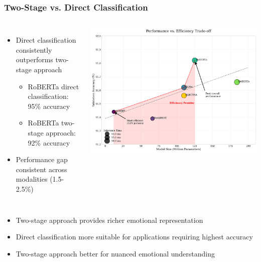 \begin{frame}
\frametitle{Two-Stage vs. Direct Classification}
\begin{columns}
\begin{itemize}
    \item Direct classification consistently outperforms two-stage approach
    \begin{itemize}
        \item RoBERTa direct classification: 95\% accuracy
        \item RoBERTa two-stage approach: 92\% accuracy
    \end{itemize}
    \item Performance gap consistent across modalities (1.5-2.5\%)
\end{itemize}

\includegraphics[width=\textwidth]{figures/performance_efficiency.png}
\end{columns}

\begin{itemize}
    \item Two-stage approach provides richer emotional representation
    \item Direct classification more suitable for applications requiring highest accuracy
    \item Two-stage approach better for nuanced emotional understanding
\end{itemize}
\end{frame}

